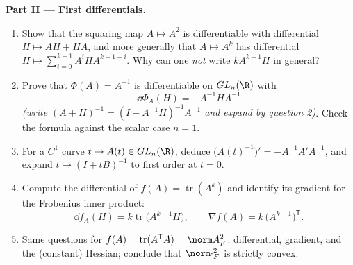 \begin{problem}
\medskip
\noindent\textbf{Part II --- First differentials.}
\begin{enumerate}[resume]
  \item Show that the squaring map $A \mapsto A^2$ is
        differentiable with differential $H \mapsto AH + HA$,
        and more generally that $A \mapsto A^k$ has
        differential $H \mapsto \sum_{i=0}^{k-1}
        A^iHA^{k-1-i}$. Why can one \emph{not} write $kA^{k-1}H$
        in general?
  \item Prove that $\Phi(A) = A^{-1}$ is differentiable on
        $GL_n(\R)$ with
        \[
        \dd\Phi_A(H) = -A^{-1}HA^{-1}
        \]
        \emph{(write $(A + H)^{-1} = (I + A^{-1}H)^{-1}A^{-1}$
        and expand by question 2)}. Check the formula against
        the scalar case $n = 1$.
  \item For a $C^1$ curve $t \mapsto A(t) \in GL_n(\R)$, deduce
        $\bigl(A(t)^{-1}\bigr)' = -A^{-1}A'A^{-1}$, and expand
        $t \mapsto (I + tB)^{-1}$ to first order at $t = 0$.
  \item Compute the differential of $f(A) =
        \operatorname{tr}(A^k)$ and identify its gradient for
        the Frobenius inner product:
        \[
        \dd f_A(H) = k\operatorname{tr}\bigl(A^{k-1}H\bigr),
        \qquad
        \nabla f(A) = k\,\bigl(A^{k-1}\bigr)^{\mathsf T} .
        \]
  \item Same questions for $f(A) = \operatorname{tr}
        (A^{\mathsf T}A) = \norm A_F^2$: differential,
        gradient, and the (constant) Hessian; conclude that
        $\norm\cdot_F^2$ is strictly convex.
\end{enumerate}


\end{problem}
